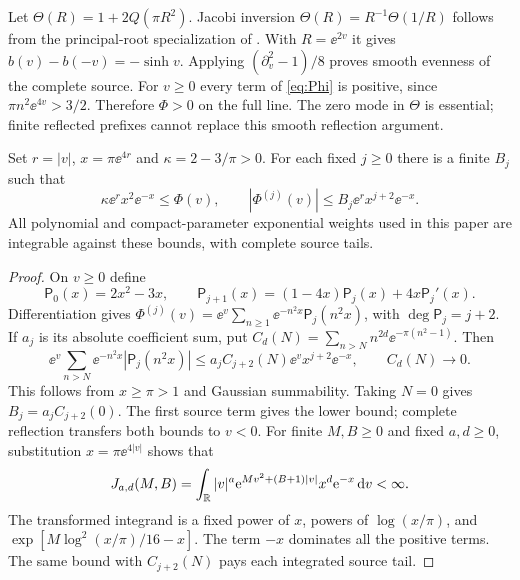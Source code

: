 Let $\Theta(R)=1+2Q(\pi R^2)$. Jacobi inversion
$\Theta(R)=R^{-1}\Theta(1/R)$ follows from the principal-root specialization
of \cite[20.7.32]{DLMFThetaModular}. With $R=\ee^{2v}$ it gives
$b(v)-b(-v)=-\sinh v$. Applying $(\partial_v^2-1)/8$ proves smooth evenness
of the complete source. For $v\ge0$ every term of \eqref{eq:Phi} is positive,
since $\pi n^2\ee^{4v}>3/2$. Therefore $\Phi>0$ on the full line.
The zero mode in $\Theta$ is essential; finite reflected prefixes cannot
replace this smooth reflection argument.

\begin{lemma}\label{lem:source}
Set $r=|v|$, $x=\pi\ee^{4r}$ and $\kappa=2-3/\pi>0$. For each fixed
$j\ge0$ there is a finite $B_j$ such that
\begin{equation}\label{eq:sourcebounds}
 \kappa\ee^r x^2\ee^{-x}\le\Phi(v),\qquad
 |\Phi^{(j)}(v)|\le B_j\ee^r x^{j+2}\ee^{-x}.
\end{equation}
All polynomial and compact-parameter exponential weights used in this
paper are integrable against these bounds, with complete source tails.
\end{lemma}
\begin{proof}
On $v\ge0$ define
\[
 \mathsf P_0(x)=2x^2-3x,\qquad
 \mathsf P_{j+1}(x)=(1-4x)\mathsf P_j(x)+4x\mathsf P_j'(x).
\]
Differentiation gives
$\Phi^{(j)}(v)=\ee^v\sum_{n\ge1}\ee^{-n^2x}\mathsf P_j(n^2x)$,
with $\deg\mathsf P_j=j+2$. If $a_j$ is its absolute coefficient sum, put
$C_d(N)=\sum_{n>N}n^{2d}\ee^{-\pi(n^2-1)}$. Then
\begin{equation}\label{eq:sourcetail}
 \ee^v\sum_{n>N}\ee^{-n^2x}|\mathsf P_j(n^2x)|
 \le a_jC_{j+2}(N)\ee^v x^{j+2}\ee^{-x},\qquad C_d(N)\longrightarrow0.
\end{equation}
This follows from $x\ge\pi>1$ and Gaussian summability. Taking $N=0$
gives $B_j=a_jC_{j+2}(0)$. The first source term gives the lower bound;
complete reflection transfers both bounds to $v<0$.
For finite $M,B\ge0$ and fixed $a,d\ge0$, substitution
$x=\pi\ee^{4|v|}$ shows that
\begin{equation}\label{eq:J}
 J_{a,d}(M,B)=\int_\mathbb R |v|^a\mathrm e^{Mv^2+(B+1)|v|}x^d\mathrm e^{-x}\,\mathrm d v<\infty.
\end{equation}
The transformed integrand is a fixed power of $x$, powers of $\log(x/\pi)$,
and $\exp[M\log^2(x/\pi)/16-x]$. The term $-x$ dominates all the positive
terms. The same bound with $C_{j+2}(N)$ pays each integrated source tail.
\end{proof}

